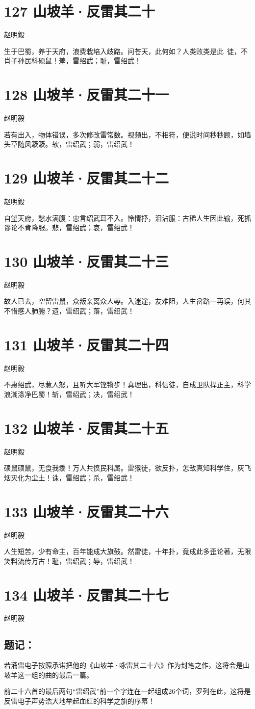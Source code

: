 \documentclass[UTF8,12pt,oneside]{ctexbook}
\def\pau#1{\begin{center} {#1} \end{center}} %
\def\poem#1#2{\section{#1}\pau{#2}} %
\begin{document}
\newpage

\poem{127 山坡羊·反雷其二十}{赵明毅}

    生于巴蜀，养于天府，浪费栽培入歧路。问苍天，此何如？人类败类是此~徒，不肖子孙民科硕鼠！羞，雷绍武；耻，雷绍武！
~\\
    
\poem{128 山坡羊·反雷其二十一}{赵明毅}

    若有出入，物体错误，多次修改雷常数。视频出，不相符，便说时间秒秒顾，如墙头草随风簌簌。软，雷绍武；弱，雷绍武！
~\\
    
\poem{129 山坡羊·反雷其二十二}{赵明毅}

    自望天府，愁水满腹：忠言绍武耳不入。怜情抒，泪沾服：古稀人生因此输，死抓谬论不肯降服。悲，雷绍武；哀，雷绍武！

\newpage
    
\poem{130 山坡羊·反雷其二十三}{赵明毅}

    故人已去，空留雷鼠，众叛亲离众人辱。入迷途，友难阻，人生岔路一再误，何其不惜感人肺腑？遗，雷绍武；落，雷绍武！
~\\
    
\poem{131 山坡羊·反雷其二十四}{赵明毅}

    不惠绍武，尽惹人怒，且听大军铿锵步！真理出，科信徒，自成卫队捍正主，科学浪潮涤净巴蜀！斩，雷绍武；决，雷绍武！
~\\
    
\poem{132 山坡羊·反雷其二十五}{赵明毅}

    硕鼠硕鼠，无食我黍！万人共愤民科属。雷猴徒，欲反扑，怎敌真知科学住，灰飞烟灭化为尘土！诛，雷绍武；杀，雷绍武！

\newpage
    
\poem{133 山坡羊·反雷其二十六}{赵明毅}

    人生短苦，少有命主，百年能成大旗鼓。然雷徒，十年扑，竟成此多歪论著，无限笑料流传万古！耻，雷绍武；辱，雷绍武！
    
\poem{134 山坡羊·反雷其二十七}{赵明毅}
    \subsection{题记：}
    \normalsize
    \kaishu

    若涌雷电子按照承诺把他的《山坡羊·咏雷其二十六》作为封笔之作，这将会是山坡羊这一组的曲的最后一篇。

    前二十六首的最后两句“雷绍武”前一个字连在一起组成26个词，罗列在此，这将是反雷电子声势浩大地举起血红的科学之旗的序幕！
\end{document}
